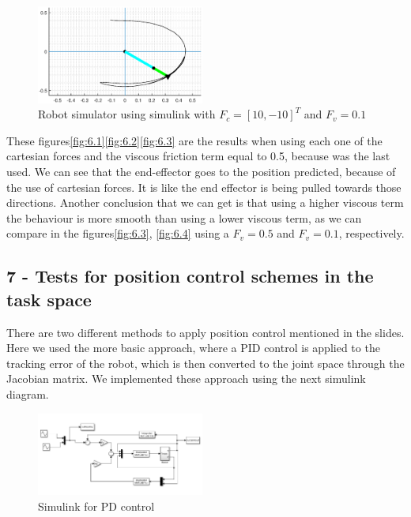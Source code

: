\begin{figure}[H]
    \centering
    \includegraphics[width=0.49\textwidth]{imgs/6.4.eps}
    \caption{Robot simulator using simulink with $F_c = [10,-10]^T$ and $F_v = 0.1$}
    \label{fig:6.4}
\end{figure}



These figures\eqref{fig:6.1}\eqref{fig:6.2}\eqref{fig:6.3} are the results when using each one of the cartesian forces and the viscous friction term equal to 0.5, because was the last used. We can see that the end-effector goes to the position predicted, because of the use of cartesian forces. It is like the end effector is being pulled towards those directions. Another conclusion that we can get is that using a higher viscous term the behaviour is more smooth than using a lower viscous term, as we can compare in the figures\eqref{fig:6.3}, \eqref{fig:6.4} using a $F_v = 0.5$ and $F_v = 0.1$, respectively.

\subsection{7 - Tests for position control schemes in the task space}

There are two different methods to apply position control mentioned in the slides. Here we used the more basic approach, where a PID control is applied to the tracking error
of the robot, which is then converted to the joint space through the Jacobian matrix. We implemented these approach using the next simulink diagram.

\begin{figure}[H]
    \centering
    \includegraphics[width=0.49\textwidth]{imgs/7.1.png}
    \caption{Simulink for PD control}
    \label{fig:7.1}
\end{figure}

